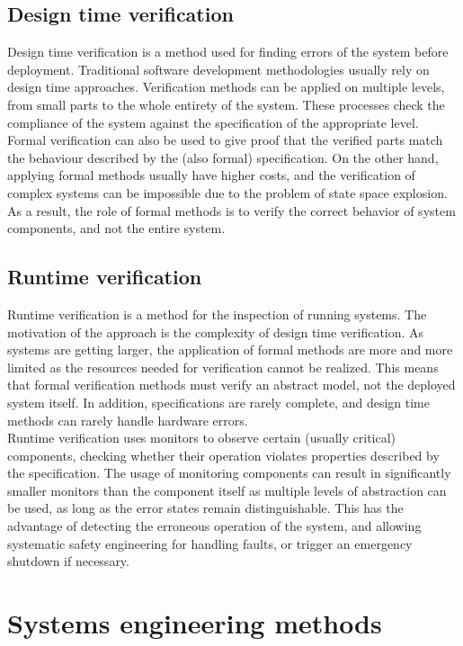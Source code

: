 \subsection{Design time verification}

Design time verification is a method used for finding errors of the system before deployment. Traditional software development methodologies usually rely on design time approaches. Verification methods can be applied on multiple levels, from small parts to the whole entirety of the system. These processes check the compliance of the system against the specification of the appropriate level.\\
Formal verification can also be used to give proof that the verified parts match the behaviour described by the (also formal) specification. On the other hand, applying formal methods usually have higher costs, and the verification of complex systems can be impossible due to the problem of state space explosion. As a result, the role of formal methods is to verify the correct behavior of system components, and not the entire system.

\subsection{Runtime verification}

Runtime verification is a method for the inspection of running systems. The motivation of the approach is the complexity of design time verification. As systems are getting larger, the application of formal methods are more and more limited as the resources needed for verification cannot be realized. This means that formal verification methods must verify an abstract model, not the deployed system itself. In addition, specifications are rarely complete, and design time methods can rarely handle hardware errors.\\
Runtime verification uses monitors to observe certain (usually critical) components, checking whether their operation violates properties described by the specification. The usage of monitoring components can result in significantly smaller monitors than the component itself as multiple levels of abstraction can be used, as long as the error states remain distinguishable. This has the advantage of detecting the erroneous operation of the system, and allowing systematic safety engineering for handling faults, or trigger an emergency shutdown if necessary.

\section{Systems engineering methods}

